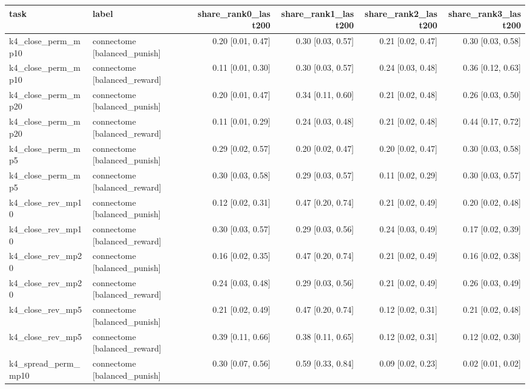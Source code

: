 \begin{table}[t]
\centering
\small
\begin{tabular}{llrrrr}
\toprule
task & label & share\_rank0\_last200 & share\_rank1\_last200 & share\_rank2\_last200 & share\_rank3\_last200 \\
\midrule
k4\_close\_perm\_mp10 & connectome [balanced\_punish] & 0.20 [0.01, 0.47] & 0.30 [0.03, 0.57] & 0.21 [0.02, 0.47] & 0.30 [0.03, 0.58] \\
k4\_close\_perm\_mp10 & connectome [balanced\_reward] & 0.11 [0.01, 0.30] & 0.30 [0.03, 0.57] & 0.24 [0.03, 0.48] & 0.36 [0.12, 0.63] \\
k4\_close\_perm\_mp20 & connectome [balanced\_punish] & 0.20 [0.01, 0.47] & 0.34 [0.11, 0.60] & 0.21 [0.02, 0.48] & 0.26 [0.03, 0.50] \\
k4\_close\_perm\_mp20 & connectome [balanced\_reward] & 0.11 [0.01, 0.29] & 0.24 [0.03, 0.48] & 0.21 [0.02, 0.48] & 0.44 [0.17, 0.72] \\
k4\_close\_perm\_mp5 & connectome [balanced\_punish] & 0.29 [0.02, 0.57] & 0.20 [0.02, 0.47] & 0.20 [0.02, 0.47] & 0.30 [0.03, 0.58] \\
k4\_close\_perm\_mp5 & connectome [balanced\_reward] & 0.30 [0.03, 0.58] & 0.29 [0.03, 0.57] & 0.11 [0.02, 0.29] & 0.30 [0.03, 0.57] \\
k4\_close\_rev\_mp10 & connectome [balanced\_punish] & 0.12 [0.02, 0.31] & 0.47 [0.20, 0.74] & 0.21 [0.02, 0.49] & 0.20 [0.02, 0.48] \\
k4\_close\_rev\_mp10 & connectome [balanced\_reward] & 0.30 [0.03, 0.57] & 0.29 [0.03, 0.56] & 0.24 [0.03, 0.49] & 0.17 [0.02, 0.39] \\
k4\_close\_rev\_mp20 & connectome [balanced\_punish] & 0.16 [0.02, 0.35] & 0.47 [0.20, 0.74] & 0.21 [0.02, 0.49] & 0.16 [0.02, 0.38] \\
k4\_close\_rev\_mp20 & connectome [balanced\_reward] & 0.24 [0.03, 0.48] & 0.29 [0.03, 0.56] & 0.21 [0.02, 0.49] & 0.26 [0.03, 0.49] \\
k4\_close\_rev\_mp5 & connectome [balanced\_punish] & 0.21 [0.02, 0.49] & 0.47 [0.20, 0.74] & 0.12 [0.02, 0.31] & 0.21 [0.02, 0.48] \\
k4\_close\_rev\_mp5 & connectome [balanced\_reward] & 0.39 [0.11, 0.66] & 0.38 [0.11, 0.65] & 0.12 [0.02, 0.31] & 0.12 [0.02, 0.30] \\
k4\_spread\_perm\_mp10 & connectome [balanced\_punish] & 0.30 [0.07, 0.56] & 0.59 [0.33, 0.84] & 0.09 [0.02, 0.23] & 0.02 [0.01, 0.02] \\

\end{tabular}
\end{table}
